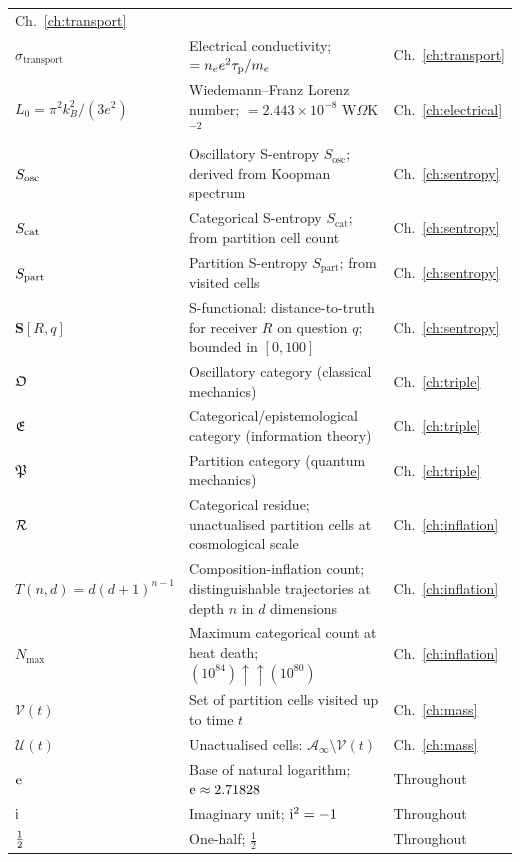 \begin{longtable}{@{}lp{9cm}l@{}}
  Ch.~\ref{ch:transport} \\
$\sigma_{\text{transport}}$ & Electrical conductivity;
  $=n_{e}e^{2}\tau_{\mathrm{p}}/m_{e}$ & Ch.~\ref{ch:transport} \\
$L_{0}=\pi^{2}k_B^{2}/(3e^{2})$ & Wiedemann--Franz Lorenz number;
  $=2.443\times 10^{-8}$ W$\Omega$K$^{-2}$ & Ch.~\ref{ch:electrical} \\
$S_{\mathrm{osc}}$ & Oscillatory S-entropy $S_{\text{osc}}$; derived from Koopman spectrum &
  Ch.~\ref{ch:sentropy} \\
$S_{\mathrm{cat}}$ & Categorical S-entropy $S_{\text{cat}}$; from partition cell count &
  Ch.~\ref{ch:sentropy} \\
$S_{\mathrm{part}}$ & Partition S-entropy $S_{\text{part}}$; from visited cells &
  Ch.~\ref{ch:sentropy} \\
$\mathbf{S}[R,q]$ & S-functional: distance-to-truth for receiver $R$
  on question $q$; bounded in $[0,100]$ & Ch.~\ref{ch:sentropy} \\
$\mathfrak{O}$ & Oscillatory category (classical mechanics) &
  Ch.~\ref{ch:triple} \\
$\mathfrak{E}$ & Categorical/epistemological category (information theory) &
  Ch.~\ref{ch:triple} \\
$\mathfrak{P}$ & Partition category (quantum mechanics) &
  Ch.~\ref{ch:triple} \\
$\mathcal{R}$ & Categorical residue; unactualised partition cells at
  cosmological scale & Ch.~\ref{ch:inflation} \\
$T(n,d)=d(d+1)^{n-1}$ & Composition-inflation count; distinguishable
  trajectories at depth $n$ in $d$ dimensions & Ch.~\ref{ch:inflation} \\
$N_{\max}$ & Maximum categorical count at heat death;
  $(10^{84})\uparrow\uparrow(10^{80})$ & Ch.~\ref{ch:inflation} \\
$\mathcal{V}(t)$ & Set of partition cells visited up to time $t$ &
  Ch.~\ref{ch:mass} \\
$\mathcal{U}(t)$ & Unactualised cells: $\mathcal{A}_{\infty}\setminus\mathcal{V}(t)$ &
  Ch.~\ref{ch:mass} \\
$\mathrm{e}$ & Base of natural logarithm; $\mathrm{e}\approx 2.71828$ &
  Throughout \\
$\mathrm{i}$ & Imaginary unit; $\mathrm{i}^{2}=-1$ &
  Throughout \\
$\tfrac{1}{2}$ & One-half; $\tfrac{1}{2}$ &
  Throughout \\
\end{longtable}

